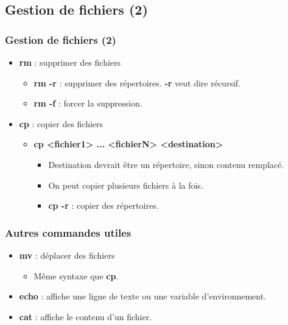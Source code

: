 \documentclass{beamer}
\begin{document}
    \subsection{Gestion de fichiers (2)}
    \begin{frame}
        \frametitle{Gestion de fichiers (2)}
        \begin{itemize}
            \item {\bf rm} : supprimer des fichiers
                \begin{itemize}
                    \item {\bf rm -r} : supprimer des répertoires. {\bf -r} veut dire récursif.
                    \item {\bf rm -f} : forcer la suppression.
                \end{itemize}
            \item {\bf cp} : copier des fichiers
                \begin{itemize}
                    \item {\bf cp <fichier1> ... <fichierN> <destination>}
                        \begin{itemize}
                            \item Destination devrait être un répertoire, sinon contenu remplacé.
                            \item On peut copier plusieurs fichiers à la fois.
                            \item {\bf cp -r} : copier des répertoires.
                        \end{itemize}
                \end{itemize}
        \end{itemize}
    \end{frame}
    
    \begin{frame}
        \frametitle{Autres commandes utiles}
        \begin{itemize}
            \item {\bf mv} : déplacer des fichiers
                \begin{itemize}
                    \item Même syntaxe que {\bf cp}.
                \end{itemize}
            \item {\bf echo} : affiche une ligne de texte ou une variable d'environnement.
            \item {\bf cat} : affiche le contenu d'un fichier.
        \end{itemize}
    \end{frame}
\end{document}

